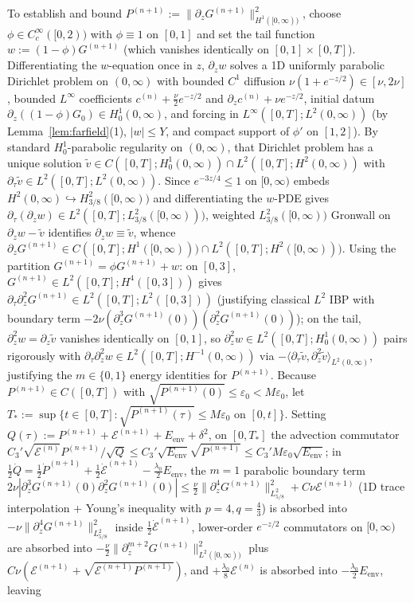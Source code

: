 \documentclass[11pt,a4paper]{article}
\begin{document}
To establish and bound $P^{(n+1)} := \|\partial_z G^{(n+1)}\|_{H^1([0,\infty))}^2$, choose $\phi \in C_c^\infty([0,2))$ with $\phi \equiv 1$ on $[0,1]$ and set the tail function $w := (1-\phi)G^{(n+1)}$ (which vanishes identically on $[0,1]\times[0,T]$). Differentiating the $w$-equation once in $z$, $\partial_z w$ solves a 1D uniformly parabolic Dirichlet problem on $(0,\infty)$ with bounded $C^1$ diffusion $\nu(1+e^{-z/2}) \in [\nu,2\nu]$, bounded $L^\infty$ coefficients $c^{(n)} + \frac{\nu}{2}e^{-z/2}$ and $\partial_z c^{(n)} + \nu e^{-z/2}$, initial datum $\partial_z((1-\phi)G_0) \in H^1_0(0,\infty)$, and forcing in $L^\infty([0,T]; L^2(0,\infty))$ (by Lemma~\ref{lem:farfield}(1), $|w|\le Y$, and compact support of $\phi'$ on $[1,2]$). By standard $H^1_0$-parabolic regularity on $(0,\infty)$, that Dirichlet problem has a unique solution $\tilde v \in C([0,T]; H^1_0(0,\infty)) \cap L^2([0,T]; H^2(0,\infty))$ with $\partial_\tau \tilde v \in L^2([0,T]; L^2(0,\infty))$. Since $e^{-3z/4} \le 1$ on $[0,\infty)$ embeds $H^2(0,\infty) \hookrightarrow H^2_{3/8}([0,\infty))$ and differentiating the $w$-PDE gives $\partial_\tau(\partial_z w) \in L^2([0,T]; L^2_{3/8}([0,\infty)))$, weighted $L^2_{3/8}([0,\infty))$ Gronwall on $\partial_z w - \tilde v$ identifies $\partial_z w \equiv \tilde v$, whence $\partial_z G^{(n+1)} \in C([0,T]; H^1([0,\infty))) \cap L^2([0,T]; H^2([0,\infty)))$. Using the partition $G^{(n+1)} = \phi G^{(n+1)} + w$: on $[0,3]$, $G^{(n+1)} \in L^2([0,T]; H^4([0,3]))$ gives $\partial_\tau\partial_z^2 G^{(n+1)} \in L^2([0,T]; L^2([0,3]))$ (justifying classical $L^2$ IBP with boundary term $-2\nu(\partial_z^3 G^{(n+1)}(0))(\partial_z^2 G^{(n+1)}(0))$); on the tail, $\partial_z^2 w = \partial_z\tilde v$ vanishes identically on $[0,1]$, so $\partial_z^2 w \in L^2([0,T]; H^1_0(0,\infty))$ pairs rigorously with $\partial_\tau\partial_z^2 w \in L^2([0,T]; H^{-1}(0,\infty))$ via $-\langle\partial_\tau\tilde v, \partial_z^2\tilde v\rangle_{L^2(0,\infty)}$, justifying the $m \in \{0,1\}$ energy identities for $P^{(n+1)}$. Because $P^{(n+1)} \in C([0,T])$ with $\sqrt{P^{(n+1)}(0)} \le \varepsilon_0 < M\varepsilon_0$, let $T_* := \sup\{t \in [0,T] : \sqrt{P^{(n+1)}(\tau)} \le M\varepsilon_0 \text{ on } [0,t]\}$. Setting $Q(\tau) := P^{(n+1)} + \mathcal{E}^{(n+1)} + E_{\mathrm{env}} + \delta^2$, on $[0,T_*]$ the advection commutator $C_3'\sqrt{\mathcal{E}^{(n)}}P^{(n+1)}/\sqrt{Q} \le C_3'\sqrt{E_{\mathrm{env}}}\sqrt{P^{(n+1)}} \le C_3' M\varepsilon_0\sqrt{E_{\mathrm{env}}}$; in $\frac{1}{2}\dot Q = \frac{1}{2}\dot P^{(n+1)} + \frac{1}{2}\dot{\mathcal{E}}^{(n+1)} - \frac{\lambda_0}{2}E_{\mathrm{env}}$, the $m=1$ parabolic boundary term $2\nu|\partial_z^3 G^{(n+1)}(0)\partial_z^2 G^{(n+1)}(0)| \le \frac{\nu}{2}\|\partial_z^4 G^{(n+1)}\|_{L^2_{5/8}}^2 + C\nu\mathcal{E}^{(n+1)}$ (1D trace interpolation + Young's inequality with $p=4, q=\frac{4}{3}$) is absorbed into $-\nu\|\partial_z^4 G^{(n+1)}\|_{L^2_{5/8}}^2$ inside $\frac{1}{2}\dot{\mathcal{E}}^{(n+1)}$, lower-order $e^{-z/2}$ commutators on $[0,\infty)$ are absorbed into $-\frac{\nu}{2}\|\partial_z^{m+2}G^{(n+1)}\|_{L^2([0,\infty))}^2$ plus $C\nu(\mathcal{E}^{(n+1)} + \sqrt{\mathcal{E}^{(n+1)}P^{(n+1)}})$, and $+\frac{\lambda_0}{8}\mathcal{E}^{(n)}$ is absorbed into $-\frac{\lambda_0}{2}E_{\mathrm{env}}$, leaving 
\end{document}
